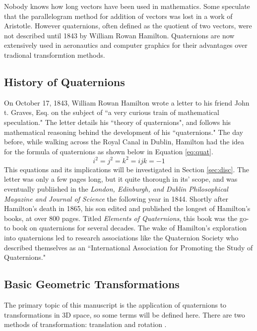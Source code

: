 Nobody knows how long vectors have been used in mathematics.
Some speculate that the parallelogram method for addition of vectors was lost in a work of Aristotle.
However quaternions, often defined as the quotient of two vectors, were not described until 1843 by William Rowan Hamilton.
Quaternions are now extensively used in aeronautics and computer graphics for their advantages over tradional transformtion methods.


\subsection{History of Quaternions}

On October 17, 1843, William Rowan Hamilton wrote a letter to his friend John t. Graves, Esq. on the subject of ``a very curious train of mathematical speculation."
The letter details his ``theory of quaternions", and follows his mathematical reasoning behind the development of his ``quaternions."
The day before, while walking across the Royal Canal in Dublin, Hamilton had the idea for the formula of quaternions as shown below in Equation \ref{eq:quat}.
\begin{equation}
\label{eq:quat}
i^2 = j^2 = k^2 = ijk = -1
\end{equation}
This equations and its implications will be investigated in Section \ref{sec:disc}.
The letter was only a few pages long, but it quite thorough in its' scope, and was eventually publiished in the \textit{London, Edinburgh, and Dublin Philosophical Magazine and Journal of Science} the following year in 1844.
Shortly after Hamilton's death in 1865, his son edited and published the longest of Hamilton's books, at over 800 pages.
Titled \textit{Elements of Quaternions}, this book was the go-to book on quaternions for several decades.
The wake of Hamilton's exploration into quaternions led to research associations like the Quaternion Society who described themselves as an ``International Association for Promoting the Study of Quaternions."

\subsection{Basic Geometric Transformations}

The primary topic of this manuscript is the application of quaternions to transformations in 3D space, so some terms will be defined here.
There are two methods of transformation: translation and rotation \cite{animation}.

